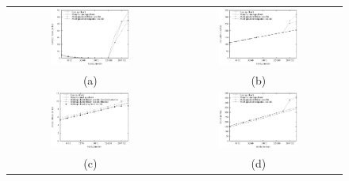 \documentclass[acmtocl]{acmtrans2m}
\begin{document}
\begin{figure}
\centering
\begin{tabular}{cc}
\includegraphics[width=0.5\textwidth]{plots/quicksort_cache_misses.eps} & \includegraphics[width=0.5\textwidth]{plots/quicksort_instruction_counts.eps} \\
(a) & (b) \\ 
\includegraphics[width=0.5\textwidth]{plots/quicksort_branch_misses.eps} & \includegraphics[width=0.5\textwidth]{plots/quicksort_cycles.eps} \\
(c) & (d) \\
\end{tabular}

\end{figure}
\end{document}
